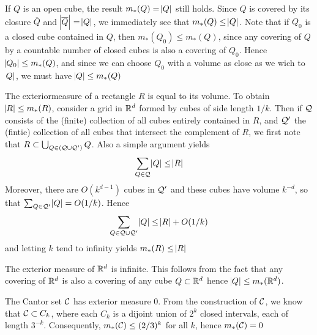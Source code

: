 \documentclass[11pt]{article}
\begin{document}
\begin{examplle}[]
If \(Q\) is an open cube, the result \(m_*(Q)=\abs{Q}\) still holds. Since \(Q\) is
covered by its closure \(\overline{Q}\) and \(\abs{\overline{Q}}=\abs{Q}\), we
immediately see that \(m_*(Q)\le\abs{Q}\). Note that if \(Q_0\) is a closed cube
contained in \(Q\), then \(m_*(Q_0)\le m_*(Q)\), since any covering of \(Q\) by a
countable number of closed cubes is also a covering of \(Q_0\). Hence
\(\abs{Q_0}\le m_*(Q)\), and since we can choose \(Q_0\) with a volume as close
as we wich to \(\abs{Q}\), we must have \(\abs{Q}\le m_*(Q)\)
\end{examplle}

\begin{examplle}[]
The exteriormeasure of a rectangle \(R\) is equal to its volume. To obtain
\(\abs{R}\le m_*(R)\), consider a grid in \(\mathbb{R}^d\) formed by cubes of side length
\(1/k\). Then if \(\mathcal{Q}\) consists of the (finite) collection of all cubes entirely
contained in \(R\), and \(\mathcal{Q}'\) the (fintie) collection of all cubes that
intersect the complement of \(R\), we first note that
\(R\subset\bigcup_{Q\in(\mathcal{Q}\cup\mathcal{Q}')}Q\). Also a simple argument yields
\begin{equation*}
\displaystyle\sum_{Q\in\mathcal{Q}}\abs{Q}\le\abs{R}
\end{equation*}
Moreover, there are \(O(k^{d-1})\) cubes in \(\mathcal{Q}'\) and these cubes have
volume \(k^{-d}\), so that \(\sum_{Q\in\mathcal{Q}'}\abs{Q}=O(1/k)\). Hence
\begin{equation*}
\displaystyle\sum_{Q\in\mathcal{Q}\cup\mathcal{Q}'}\abs{Q}\le\abs{R}+O(1/k)
\end{equation*}
and letting \(k\) tend to infinity yields \(m_*(R)\le\abs{R}\)
\end{examplle}

\begin{examplle}[]
The exterior measure of \(\mathbb{R}^d\) is infinite. This follows from the fact that
any covering of \(\mathbb{R}^d\) is also a covering of any cube \(Q\subset\mathbb{R}^d\) hence
\(\abs{Q}\le m_*(\mathbb{R}^d)\).
\end{examplle}

\begin{examplle}[]
The Cantor set \(\mathcal{C}\) has exterior measure 0. From the construction of
\(\mathcal{C}\), we know that \(\mathcal{C}\subset C_k\), where each \(C_k\) is a dijoint union
of \(2^k\) closed intervals, each of length \(3^{-k}\). Consequently,
\(m_*(\mathcal{C})\le(2/3)^k\) for all \(k\), hence \(m_*(\mathcal{C})=0\)
\end{examplle}
\end{document}
